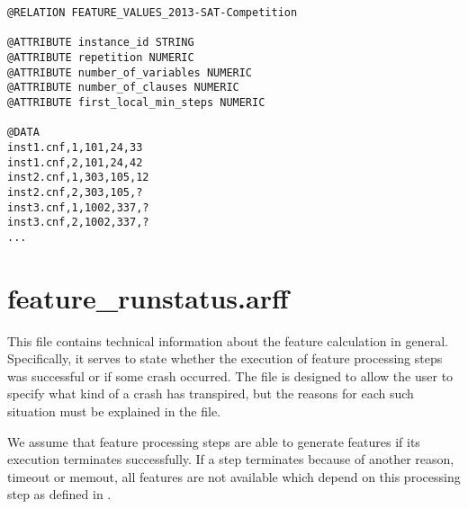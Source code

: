 \documentclass[]{elsarticle}
\begin{document}
\begin{lstlisting}[caption=Example feature\_values.arff with three features]
@RELATION FEATURE_VALUES_2013-SAT-Competition

@ATTRIBUTE instance_id STRING
@ATTRIBUTE repetition NUMERIC
@ATTRIBUTE number_of_variables NUMERIC
@ATTRIBUTE number_of_clauses NUMERIC
@ATTRIBUTE first_local_min_steps NUMERIC

@DATA
inst1.cnf,1,101,24,33
inst1.cnf,2,101,24,42
inst2.cnf,1,303,105,12
inst2.cnf,2,303,105,?
inst3.cnf,1,1002,337,?
inst3.cnf,2,1002,337,?
...
\end{lstlisting}


\section{feature\_runstatus.arff}

This file contains technical information about the feature calculation in general. Specifically, it serves to state whether 
the execution of feature processing steps was successful or if some crash occurred. The file is designed to allow the user to
specify what kind of a crash has transpired, but the reasons for each such situation must be explained in the 
 file. 

We assume that feature processing steps are able to generate features if its execution terminates successfully.
If a step terminates because of another reason, \eg{} timeout or memout,   
all features are not available which depend on this processing step as defined in .
\end{document}

